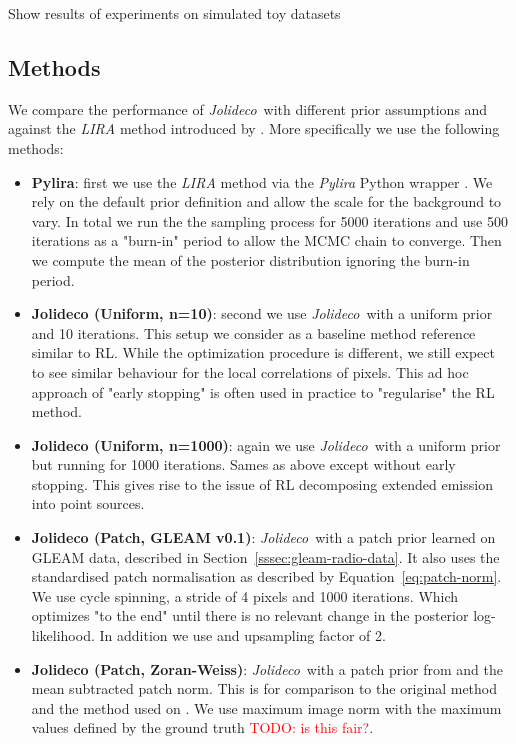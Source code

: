 \documentclass[twocolumn]{aastex631}
\newcommand{\jolideco}{\textit{Jolideco}~}
\newcommand{\todo}[1]{\textcolor{red}{TODO: #1}\PackageWarning{TODO:}{#1!}}
\begin{document}
    Show results of experiments on simulated toy datasets

    \subsection{Methods}
    \label{subsec:methods}
    We compare the performance of \jolideco with different prior assumptions and against the \textit{LIRA} method introduced by \cite{Esch2004}. More specifically we use the following methods:

    \begin{itemize}
        \item \textbf{Pylira}: first we use the \textit{LIRA} method \citep{Esch2004} via the \textit{Pylira} Python wrapper \citep{Donath2022}. We rely on the default prior definition and allow the scale for the background to vary. In total we run the the sampling process for 5000 iterations and use 500 iterations as a "burn-in" period to allow the MCMC chain to converge. Then we compute the mean of the posterior distribution ignoring the burn-in period.
        
        \item \textbf{Jolideco (Uniform, n=10)}: second we use \jolideco with a uniform prior and 10 iterations. This setup we consider as a baseline method reference similar to RL. While the optimization procedure is different, we still expect to see similar behaviour for the local correlations of pixels. This ad hoc approach of "early stopping" is often used in practice to "regularise" the RL method.
        
        \item \textbf{Jolideco (Uniform, n=1000)}: again we use \jolideco with a uniform prior but running for 1000 iterations. Sames as above except without early stopping. This gives rise to the issue of RL decomposing extended emission into point sources. 
        
        \item \textbf{Jolideco (Patch, GLEAM v0.1)}: \jolideco with a patch prior learned on GLEAM data, described in Section~\ref{sssec:gleam-radio-data}. It also uses the standardised patch normalisation as described by Equation~\ref{eq:patch-norm}. We use cycle spinning, a stride of 4 pixels and 1000 iterations. Which optimizes "to the end" until there is no relevant change in the posterior log-likelihood. In addition we use and upsampling factor of 2.
        
        \item \textbf{Jolideco (Patch, Zoran-Weiss)}: \jolideco with a patch prior from \cite{Zoran2011} and the mean subtracted patch norm. This is for comparison to the original method and the method used on \cite{Bouman2016}. We use maximum image norm with the maximum values defined by the ground truth \todo{is this fair?}.
    \end{itemize}
\end{document}
